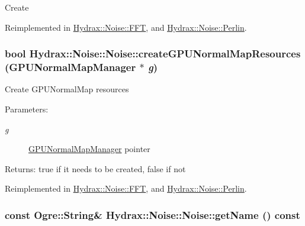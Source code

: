 Create 

Reimplemented in \hyperlink{class_hydrax_1_1_noise_1_1_f_f_t_c382e8624b864a32267687592b769bd3}{Hydrax::Noise::FFT}, and \hyperlink{class_hydrax_1_1_noise_1_1_perlin_3e260e7c239d90da210aa3e27289c6f0}{Hydrax::Noise::Perlin}.\hypertarget{class_hydrax_1_1_noise_1_1_noise_59f0e03e88a5de69065838adc35ff2d8}{
\subsubsection[{createGPUNormalMapResources}]{\setlength{\rightskip}{0pt plus 5cm}bool Hydrax::Noise::Noise::createGPUNormalMapResources ({\bf GPUNormalMapManager} $\ast$ {\em g})}}
\label{class_hydrax_1_1_noise_1_1_noise_59f0e03e88a5de69065838adc35ff2d8}


Create GPUNormalMap resources \begin{Desc}
\item[Parameters:]
\begin{description}
\item[{\em g}]\hyperlink{class_hydrax_1_1_g_p_u_normal_map_manager}{GPUNormalMapManager} pointer \end{description}
\end{Desc}
\begin{Desc}
\item[Returns:]true if it needs to be created, false if not \end{Desc}


Reimplemented in \hyperlink{class_hydrax_1_1_noise_1_1_f_f_t_a8e2b9d2b8307c07be2d2cd9cf115560}{Hydrax::Noise::FFT}, and \hyperlink{class_hydrax_1_1_noise_1_1_perlin_db347b98692bd7ce6ad7ce76c605d15a}{Hydrax::Noise::Perlin}.\hypertarget{class_hydrax_1_1_noise_1_1_noise_bd7bddafc148656d1a7782c94fb4a7aa}{
\subsubsection[{getName}]{\setlength{\rightskip}{0pt plus 5cm}const Ogre::String\& Hydrax::Noise::Noise::getName () const}}
\label{class_hydrax_1_1_noise_1_1_noise_bd7bddafc148656d1a7782c94fb4a7aa}


